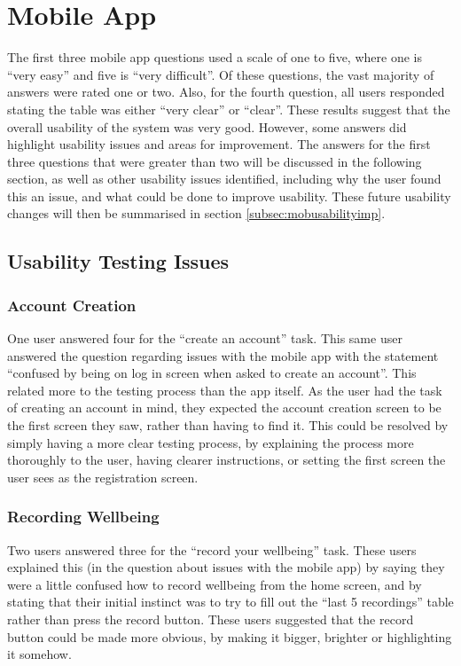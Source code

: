 \documentclass[11pt,openright,a4paper]{report}
\begin{document}
\section{Mobile App}
The first three mobile app questions used a scale of one to five, where one is \enquote{very easy} and five is \enquote{very difficult}. Of these questions, the vast majority of answers were rated one or two. Also, for the fourth question, all users responded stating the table was either \enquote{very clear} or \enquote{clear}. These results suggest that the overall usability of the system was very good. However, some answers did highlight usability issues and areas for improvement. The answers for the first three questions that were greater than two will be discussed in the following section, as well as other usability issues identified, including why the user found this an issue, and what could be done to improve usability. These future usability changes will then be summarised in section \ref{subsec:mobusabilityimp}.

\subsection{Usability Testing Issues}
\subsubsection{Account Creation}
One user answered four for the \enquote{create an account} task. This same user answered the question regarding issues with the mobile app with the statement \enquote{confused by being on log in screen when asked to create an account}. This related more to the testing process than the app itself. As the user had the task of creating an account in mind, they expected the account creation screen to be the first screen they saw, rather than having to find it. This could be resolved by simply having a more clear testing process, by explaining the process more thoroughly to the user, having clearer instructions, or setting the first screen the user sees as the registration screen.

\subsubsection{Recording Wellbeing}
Two users answered three for the \enquote{record your wellbeing} task. These users explained this (in the question about issues with the mobile app) by saying they were a little confused how to record wellbeing from the home screen, and by stating that their initial instinct was to try to fill out the \enquote{last 5 recordings} table rather than press the record button. These users suggested that the record button could be made more obvious, by making it bigger, brighter or highlighting it somehow.
\end{document}
